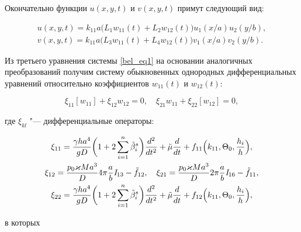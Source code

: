 Окончательно  функции $u(x,y,t)$ и $v(x,y,t)$ примут следующий вид:

\begin{gather}\label{bel_eq11}

u(x,y,t)=k_{11} a \bigl(L_1 w_{11}(t)+L_2 w_{12}(t) \bigr) u_1({x}/{a} )u_2({y}/{b}),

\\

v(x,y,t)=k_{11} a \bigl(L_3 w_{11}(t)+L_4 w_{12}(t) \bigr) v_1({x}/{a} )v_2({y}/{b} ).

\end{gather}



Из третьего уравнения системы \eqref{bel_eq1}  на основании аналогичных преобразований получим систему обыкновенных однородных дифференциальных уравнений относительно коэффициентов $w_{11}(t)$ и $w_{12}(t)$:

\begin{equation}\label{bel_eq12}

\xi_{11}\left[w_{11} \right]+\xi_{12} w_{12}=0, \quad  \xi_{21}w_{11}+\xi_{22} \left[ w_{12}\right] =0,

\end{equation}

где $\xi_{kl}$ "--- дифференциальные операторы:

\begin{gather}

\xi_{11}=\frac{\gamma h a^4}{g D}\biggl( 1+2 \sum\limits_{i=1}^n \tilde{\beta}_i^s\biggr)

\frac{d^2}{dt^2}+\tilde{\mu} \frac{d}{dt}+ f_{11}\Bigl( k_{11}, \Theta_0, \frac{h_i}{h}\Bigr), 

\\

\xi_{12}=\frac{p_0 \varkappa M a^3}{D} 4\pi \frac{a}{b} \mathit{I}_{13}-\tilde{f}_{12}, \quad \xi_{21}=\frac{p_0 \varkappa M a^3}{D} 2\pi \frac{a}{b} \mathit{I}_{16}-\tilde{f}_{11},

\\

\xi_{22}=\frac{\gamma h a^4}{g D}

\biggl( 1+2 \sum\limits_{i=1}^n \tilde{\beta}_i^s\biggr)\frac{d^2}{dt^2}+\tilde{\mu} \frac{d}{dt}+ f_{12}

\Bigl( k_{11},\Theta_0,\frac{h_i}{h}\Bigr), 

\end{gather}

в которых

